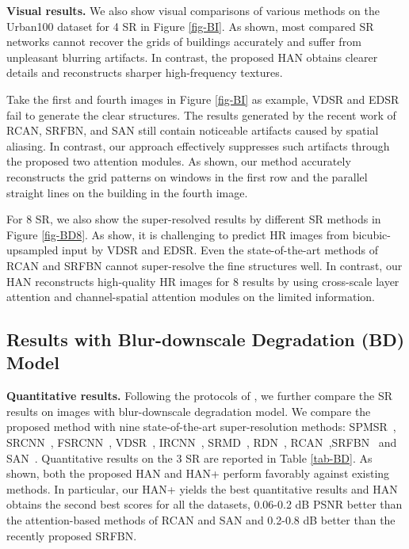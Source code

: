 \documentclass[runningheads]{llncs}
\begin{document}
\textbf{Visual results.} We also show visual comparisons of various methods on the Urban100 dataset for 4 SR in Figure \ref{fig-BI}. As shown, most compared SR networks cannot recover the grids of buildings accurately and suffer from unpleasant blurring artifacts. In contrast, the proposed HAN obtains clearer details and reconstructs sharper high-frequency textures.


Take the first and fourth images in Figure \ref{fig-BI} as example, 
VDSR and EDSR fail to generate the clear structures. The results generated by the recent work of RCAN, SRFBN, and SAN still contain noticeable artifacts caused by spatial aliasing. 
In contrast, our approach effectively suppresses such artifacts through the proposed two attention modules. As shown, our method accurately reconstructs the grid patterns on windows in the first row and the parallel straight lines on the building in the fourth image.


For 8 SR, we also show the super-resolved results by different SR methods in Figure \ref{fig-BD8}. As show, it is challenging to predict HR images from bicubic-upsampled input by VDSR and EDSR. Even the state-of-the-art methods of RCAN and SRFBN cannot super-resolve the fine structures well.
In contrast, our HAN reconstructs high-quality HR images for 8 results by using cross-scale layer attention and channel-spatial attention modules on the limited information.





\subsection{Results with Blur-downscale Degradation (BD) Model}
\noindent \textbf{Quantitative results.} Following the protocols of \cite{zhang2018learning,zhang2017learning,zhang2018residual}, we further compare the SR results on images with blur-downscale degradation model. We compare the proposed method with nine state-of-the-art super-resolution methods: SPMSR~\cite{peleg2014statistical}, SRCNN~\cite{dong2014learning}, FSRCNN~\cite{dong2016accelerating}, VDSR~\cite{kim2016accurate}, IRCNN~\cite{zhang2017learning}, SRMD~\cite{zhang2006edge}, RDN~\cite{zhang2018residual}, RCAN~\cite{zhang2018image},SRFBN~\cite{li2019feedback} and SAN~\cite{dai2019second}. Quantitative results on the 3 SR are reported in Table \ref{tab-BD}. 
As shown, both the proposed HAN and HAN+ perform favorably against existing methods. 
In particular, our HAN+ yields the best quantitative results and HAN obtains the second best scores for all the datasets, 0.06-0.2 dB PSNR better than the attention-based methods of RCAN and SAN and 0.2-0.8 dB better than the recently proposed SRFBN.
\end{document}
